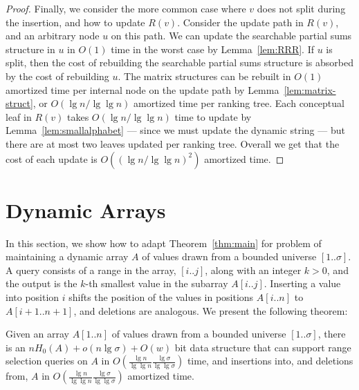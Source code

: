 \documentclass{llncs}
\begin{document}
\begin{proof}
Finally, we consider the more common case where $v$ does not split
during the insertion, and how to update $R(v)$.  Consider the update
path in $R(v)$, and an arbitrary node $u$ on this path.  We can update
the searchable partial sums structure in $u$ in $O(1)$ time in the
worst case by Lemma~\ref{lem:RRR}.  If $u$ is split, then the cost of
rebuilding the searchable partial sums structure is absorbed by the
cost of rebuilding $u$.  The matrix structures can be rebuilt in
$O(1)$ amortized time per internal node on the update path by
Lemma~\ref{lem:matrix-struct}, or $O(\lg n / \lg \lg n)$ amortized
time per ranking tree.  Each conceptual leaf in $R(v)$ takes $O(\lg n/
\lg \lg n)$ time to update by Lemma~\ref{lem:smallalphabet} --- since
we must update the dynamic string --- but there are at most two leaves
updated per ranking tree.  Overall we get that the cost of each update
is $O((\lg n / \lg \lg n)^2)$ amortized time.  
\end{proof}

\section{Dynamic Arrays\label{sec:dynarray}}

In this section, we show how to adapt Theorem~\ref{thm:main} for
problem of maintaining a dynamic array $A$ of values drawn from a
bounded universe $[1 ..\sigma]$.  A query consists of a range in the
array, $[i..j]$, along with an integer $k > 0$, and the output is the
$k$-th smallest value in the subarray $A[i..j]$.  Inserting a value
into position $i$ shifts the position of the values in positions
$A[i..n]$ to $A[i+1..n+1]$, and deletions are analogous.  We present
the following theorem:

\begin{theorem}
\label{thm:dynarray}
Given an array $A[1..n]$ of values drawn from a bounded universe
$[1..\sigma]$, there is an $n H_0(A) + o(n \lg \sigma) + O(w)$ bit
data structure that can support range selection queries on $A$ in
$O(\frac{\lg n}{\lg \lg n} \frac{\lg \sigma}{\lg \lg \sigma})$ time,
and insertions into, and deletions from, $A$ in $O(\frac{\lg n}{\lg
  \lg n} \frac{\lg \sigma}{\lg \lg \sigma})$ amortized time.
\end{theorem}
\end{document}
